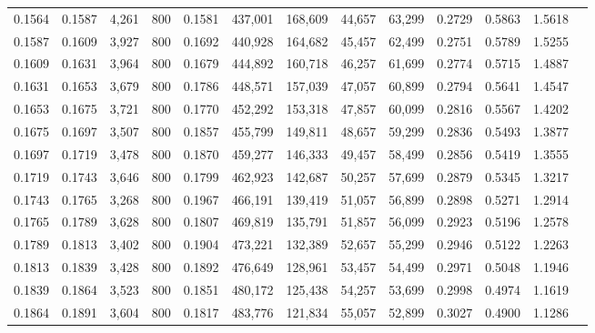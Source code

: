 \begin{tabular}{rrrrrrrrrrrrr}
0.1564 & 0.1587 &  4,261 &   800 &                                     0.1581 & 437,001 & 168,609 &  44,657 &  63,299 & 0.2729 & 0.5863 & 1.5618 \\
0.1587 & 0.1609 &  3,927 &   800 &                                     0.1692 & 440,928 & 164,682 &  45,457 &  62,499 & 0.2751 & 0.5789 & 1.5255 \\
0.1609 & 0.1631 &  3,964 &   800 &                                     0.1679 & 444,892 & 160,718 &  46,257 &  61,699 & 0.2774 & 0.5715 & 1.4887 \\
0.1631 & 0.1653 &  3,679 &   800 &                                     0.1786 & 448,571 & 157,039 &  47,057 &  60,899 & 0.2794 & 0.5641 & 1.4547 \\
0.1653 & 0.1675 &  3,721 &   800 &                                     0.1770 & 452,292 & 153,318 &  47,857 &  60,099 & 0.2816 & 0.5567 & 1.4202 \\
0.1675 & 0.1697 &  3,507 &   800 &                                     0.1857 & 455,799 & 149,811 &  48,657 &  59,299 & 0.2836 & 0.5493 & 1.3877 \\
0.1697 & 0.1719 &  3,478 &   800 &                                     0.1870 & 459,277 & 146,333 &  49,457 &  58,499 & 0.2856 & 0.5419 & 1.3555 \\
0.1719 & 0.1743 &  3,646 &   800 &                                     0.1799 & 462,923 & 142,687 &  50,257 &  57,699 & 0.2879 & 0.5345 & 1.3217 \\
0.1743 & 0.1765 &  3,268 &   800 &                                     0.1967 & 466,191 & 139,419 &  51,057 &  56,899 & 0.2898 & 0.5271 & 1.2914 \\
0.1765 & 0.1789 &  3,628 &   800 &                                     0.1807 & 469,819 & 135,791 &  51,857 &  56,099 & 0.2923 & 0.5196 & 1.2578 \\
0.1789 & 0.1813 &  3,402 &   800 &                                     0.1904 & 473,221 & 132,389 &  52,657 &  55,299 & 0.2946 & 0.5122 & 1.2263 \\
0.1813 & 0.1839 &  3,428 &   800 &                                     0.1892 & 476,649 & 128,961 &  53,457 &  54,499 & 0.2971 & 0.5048 & 1.1946 \\
0.1839 & 0.1864 &  3,523 &   800 &                                     0.1851 & 480,172 & 125,438 &  54,257 &  53,699 & 0.2998 & 0.4974 & 1.1619 \\
0.1864 & 0.1891 &  3,604 &   800 &                                     0.1817 & 483,776 & 121,834 &  55,057 &  52,899 & 0.3027 & 0.4900 & 1.1286 \\

\end{tabular}
